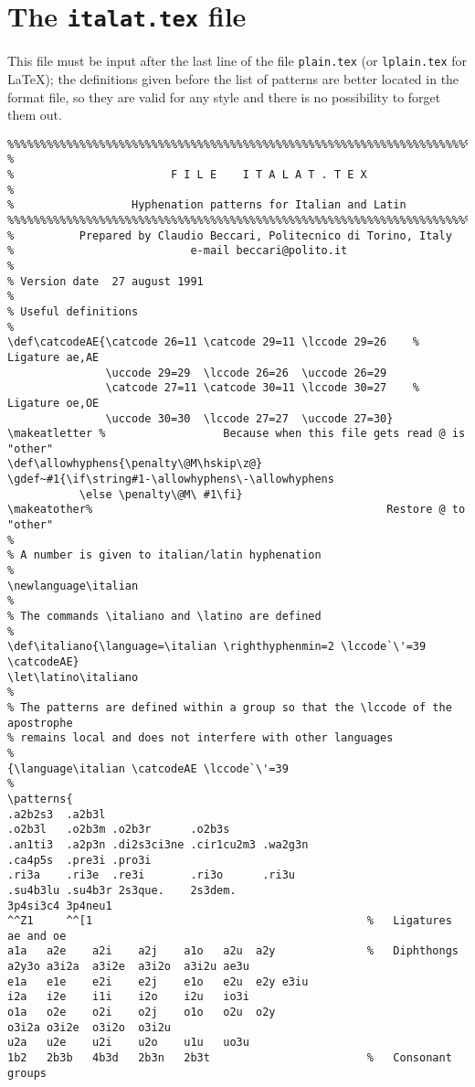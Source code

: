 \documentclass{ltugboat}
\let \italiano\relax \let\latino\relax
\begin{document}
\section{The {\tt italat.tex} file}
This  file must be input after the last line of the file {\tt plain.tex} (or
{\tt lplain.tex} for \LaTeX); the  definitions  given  before  the  list  of
patterns  are  better  located in the format file, so they are valid for any
style and there is no possibility to forget them out.
 \small
\begin{verbatim}
%%%%%%%%%%%%%%%%%%%%%%%%%%%%%%%%%%%%%%%%%%%%%%%%%%%%%%%%%%%%%%%%%%%%%%%%%%%%
%
%                        F I L E    I T A L A T . T E X
%
%                  Hyphenation patterns for Italian and Latin
%%%%%%%%%%%%%%%%%%%%%%%%%%%%%%%%%%%%%%%%%%%%%%%%%%%%%%%%%%%%%%%%%%%%%%%%%%%%
%          Prepared by Claudio Beccari, Politecnico di Torino, Italy
%                           e-mail beccari@polito.it
%
% Version date  27 august 1991
%
% Useful definitions 
%
\def\catcodeAE{\catcode 26=11 \catcode 29=11 \lccode 29=26    % Ligature ae,AE
               \uccode 29=29  \lccode 26=26  \uccode 26=29
               \catcode 27=11 \catcode 30=11 \lccode 30=27    % Ligature oe,OE
               \uccode 30=30  \lccode 27=27  \uccode 27=30}
\makeatletter %                  Because when this file gets read @ is "other"
\def\allowhyphens{\penalty\@M\hskip\z@}
\gdef~#1{\if\string#1-\allowhyphens\-\allowhyphens
           \else \penalty\@M\ #1\fi}
\makeatother%                                             Restore @ to "other"
%
% A number is given to italian/latin hyphenation
%
\newlanguage\italian
%
% The commands \italiano and \latino are defined
%
\def\italiano{\language=\italian \righthyphenmin=2 \lccode`\'=39 \catcodeAE}
\let\latino\italiano
%
% The patterns are defined within a group so that the \lccode of the apostrophe
% remains local and does not interfere with other languages
%
{\language\italian \catcodeAE \lccode`\'=39
%
\patterns{
.a2b2s3  .a2b3l
.o2b3l   .o2b3m .o2b3r      .o2b3s
.an1ti3  .a2p3n .di2s3ci3ne .cir1cu2m3 .wa2g3n
.ca4p5s  .pre3i .pro3i
.ri3a    .ri3e  .re3i       .ri3o      .ri3u
.su4b3lu .su4b3r 2s3que.    2s3dem.
3p4si3c4 3p4neu1
^^Z1     ^^[1                                          %   Ligatures ae and oe
a1a   a2e    a2i    a2j    a1o   a2u  a2y              %   Diphthongs
a2y3o a3i2a  a3i2e  a3i2o  a3i2u ae3u
e1a   e1e    e2i    e2j    e1o   e2u  e2y e3iu
i2a   i2e    i1i    i2o    i2u   io3i
o1a   o2e    o2i    o2j    o1o   o2u  o2y
o3i2a o3i2e  o3i2o  o3i2u
u2a   u2e    u2i    u2o    u1u   uo3u
1b2   2b3b   4b3d   2b3n   2b3t                        %   Consonant groups

\end{verbatim}
\end{document}
